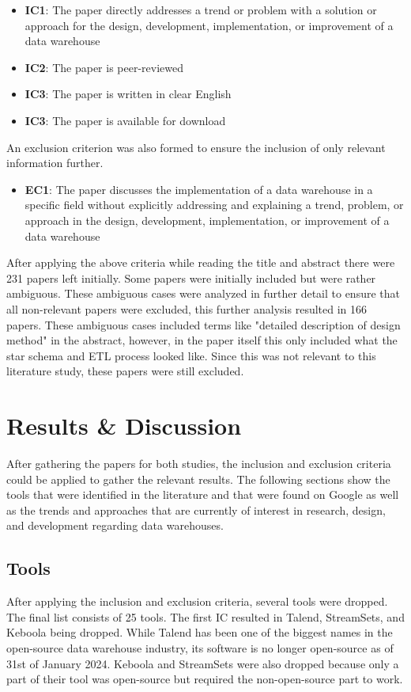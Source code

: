 \documentclass[11pt]{article}
\begin{document}
\begin{itemize}
    \item \textbf{IC1}: The paper directly addresses a trend or problem with a solution or approach for the design, development, implementation, or improvement of a data warehouse
    \item \textbf{IC2}: The paper is peer-reviewed
    \item \textbf{IC3}: The paper is written in clear English
    \item \textbf{IC3}: The paper is available for download
\end{itemize}

An exclusion criterion was also formed to ensure the inclusion of only relevant information further.
\begin{itemize}
    \item \textbf{EC1}: The paper discusses the implementation of a data warehouse in a specific field without explicitly addressing and explaining a trend, problem, or approach in the design, development, implementation, or improvement of a data warehouse
\end{itemize}

After applying the above criteria while reading the title and abstract there were 231 papers left initially. Some papers were initially included but were rather ambiguous. These ambiguous cases were analyzed in further detail to ensure that all non-relevant papers were excluded, this further analysis resulted in 166 papers. These ambiguous cases included terms like "detailed description of design method" in the abstract, however, in the paper itself this only included what the star schema and ETL process looked like. Since this was not relevant to this literature study, these papers were still excluded.\\

\section{Results \& Discussion}
\label{results}
After gathering the papers for both studies, the inclusion and exclusion criteria could be applied to gather the relevant results. The following sections show the tools that were identified in the literature and that were found on Google as well as the trends and approaches that are currently of interest in research, design, and development regarding data warehouses. \\

\subsection{Tools}
\label{results:tools}
After applying the inclusion and exclusion criteria, several tools were dropped. The final list consists of 25 tools. The first IC resulted in Talend, StreamSets, and Keboola being dropped. While Talend has been one of the biggest names in the open-source data warehouse industry, its software is no longer open-source as of 31st of January 2024. Keboola and StreamSets were also dropped because only a part of their tool was open-source but required the non-open-source part to work. \\
\end{document}
